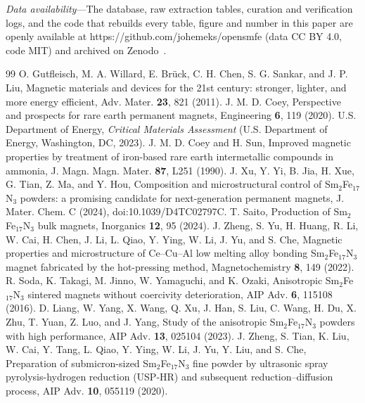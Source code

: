 \documentclass[10pt,twocolumn,letterpaper]{article}
\newcommand{\phead}[1]{\emph{#1}---}
\begin{document}
\vspace{1ex}
\noindent\phead{Data availability}The database, raw extraction tables, curation and verification logs, and the code that rebuilds every table, figure and number in this paper are openly available at https://github.com/johemeks/opensmfe (data CC BY 4.0, code MIT) and archived on Zenodo~\cite{opensmfe}.

\begin{thebibliography}{99}
 O. Gutfleisch, M. A. Willard, E. Br\"uck, C. H. Chen, S. G. Sankar, and J. P. Liu, Magnetic materials and devices for the 21st century: stronger, lighter, and more energy efficient, Adv. Mater. \textbf{23}, 821 (2011).
 J. M. D. Coey, Perspective and prospects for rare earth permanent magnets, Engineering \textbf{6}, 119 (2020).
 U.S. Department of Energy, \textit{Critical Materials Assessment} (U.S. Department of Energy, Washington, DC, 2023).
 J. M. D. Coey and H. Sun, Improved magnetic properties by treatment of iron-based rare earth intermetallic compounds in ammonia, J. Magn. Magn. Mater. \textbf{87}, L251 (1990).
 J. Xu, Y. Yi, B. Jia, H. Xue, G. Tian, Z. Ma, and Y. Hou, Composition and microstructural control of Sm$_2$Fe$_{17}$N$_3$ powders: a promising candidate for next-generation permanent magnets, J. Mater. Chem. C (2024), doi:10.1039/D4TC02797C.
 T. Saito, Production of Sm$_2$Fe$_{17}$N$_3$ bulk magnets, Inorganics \textbf{12}, 95 (2024).
 J. Zheng, S. Yu, H. Huang, R. Li, W. Cai, H. Chen, J. Li, L. Qiao, Y. Ying, W. Li, J. Yu, and S. Che, Magnetic properties and microstructure of Ce--Cu--Al low melting alloy bonding Sm$_2$Fe$_{17}$N$_3$ magnet fabricated by the hot-pressing method, Magnetochemistry \textbf{8}, 149 (2022).
 R. Soda, K. Takagi, M. Jinno, W. Yamaguchi, and K. Ozaki, Anisotropic Sm$_2$Fe$_{17}$N$_3$ sintered magnets without coercivity deterioration, AIP Adv. \textbf{6}, 115108 (2016).
 D. Liang, W. Yang, X. Wang, Q. Xu, J. Han, S. Liu, C. Wang, H. Du, X. Zhu, T. Yuan, Z. Luo, and J. Yang, Study of the anisotropic Sm$_2$Fe$_{17}$N$_3$ powders with high performance, AIP Adv. \textbf{13}, 025104 (2023).
 J. Zheng, S. Tian, K. Liu, W. Cai, Y. Tang, L. Qiao, Y. Ying, W. Li, J. Yu, Y. Liu, and S. Che, Preparation of submicron-sized Sm$_2$Fe$_{17}$N$_3$ fine powder by ultrasonic spray pyrolysis-hydrogen reduction (USP-HR) and subsequent reduction--diffusion process, AIP Adv. \textbf{10}, 055119 (2020).

\end{thebibliography}
\end{document}
